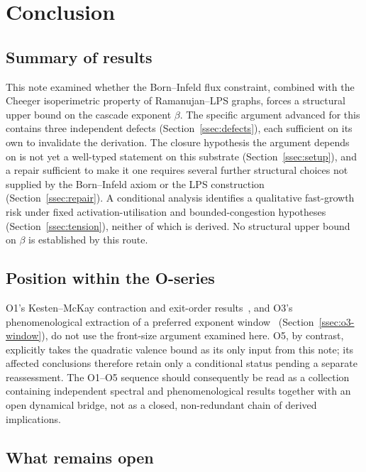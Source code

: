 \documentclass[11pt,a4paper]{article}
\theoremstyle{definition}
\theoremstyle{remark}
\begin{document}
  \section{Conclusion}
  \label{sec:conclusion}

  \subsection{Summary of results}
    \label{ssec:summary}

    This note examined whether the Born--Infeld flux constraint, combined with the Cheeger
    isoperimetric property of Ramanujan--LPS graphs, forces a structural upper bound on the
    cascade exponent $\beta$.
    The specific argument advanced for this contains three independent defects
    (Section~\ref{ssec:defects}), each sufficient on its own to invalidate the derivation.
    The closure hypothesis the argument depends on is not yet a well-typed statement on this
    substrate (Section~\ref{ssec:setup}), and a repair sufficient to make it one requires
    several further structural choices not supplied by the Born--Infeld axiom or the LPS
    construction (Section~\ref{ssec:repair}).
    A conditional analysis identifies a qualitative fast-growth risk under fixed
    activation-utilisation and bounded-congestion hypotheses (Section~\ref{ssec:tension}),
    neither of which is derived.
    No structural upper bound on $\beta$ is established by this route.

  \subsection{Position within the O-series}
    \label{ssec:o-series}

    O1's Kesten--McKay contraction and exit-order results~\cite{Beau2026a6}, and O3's
    phenomenological extraction of a preferred exponent window~\cite{Beau2026a7}
    (Section~\ref{ssec:o3-window}), do not use the front-size argument examined here.
    O5, by contrast, explicitly takes the quadratic valence bound as its only input from this
    note; its affected conclusions therefore retain only a conditional status pending a
    separate reassessment.
    The O1--O5 sequence should consequently be read as a collection containing independent
    spectral and phenomenological results together with an open dynamical bridge, not as a
    closed, non-redundant chain of derived implications.

  \subsection{What remains open}
    \label{ssec:open}
\end{document}
